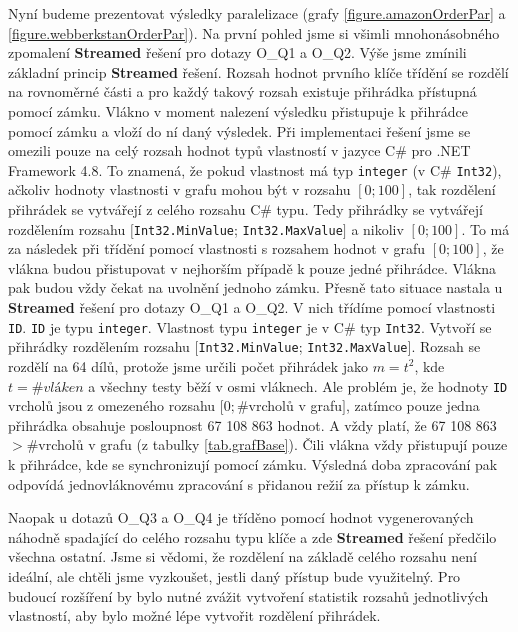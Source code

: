 Nyní budeme prezentovat výsledky paralelizace (grafy \ref{figure.amazonOrderPar} a \ref{figure.webberkstanOrderPar}).
Na první pohled jsme si všimli mnohonásobného zpomalení \textbf{Streamed} řešení pro dotazy O\_Q1 a O\_Q2.
Výše jsme zmínili základní princip \textbf{Streamed} řešení.
Rozsah hodnot prvního klíče třídění se rozdělí na rovnoměrné části a pro každý takový rozsah existuje přihrádka přístupná pomocí zámku.
Vlákno v moment nalezení výsledku přistupuje k přihrádce pomocí zámku a vloží do ní daný výsledek.
Při implementaci řešení jsme se omezili pouze na celý rozsah hodnot typů vlastností v jazyce C\# pro .NET Framework 4.8.
To znamená, že pokud vlastnost má typ \texttt{integer} (v C\# \texttt{Int32}), ačkoliv hodnoty vlastnosti v grafu mohou být v rozsahu $[0; 100]$, tak rozdělení přihrádek se vytvářejí z celého rozsahu C\# typu.
Tedy přihrádky se vytvářejí rozdělením rozsahu $[$\verb+Int32.MinValue+; \verb+Int32.MaxValue+$]$ a nikoliv $[0; 100]$.
To má za následek při třídění pomocí vlastnosti s rozsahem hodnot v grafu $[0; 100]$, že vlákna budou přistupovat v nejhorším případě k pouze jedné přihrádce.
Vlákna pak budou vždy čekat na uvolnění jednoho zámku.
Přesně tato situace nastala u \textbf{Streamed} řešení pro dotazy O\_Q1 a O\_Q2.
V nich třídíme pomocí vlastnosti \texttt{ID}. 
\texttt{ID} je typu \texttt{integer}.
Vlastnost typu \texttt{integer} je v C\# typ \texttt{Int32}.
Vytvoří se přihrádky rozdělením rozsahu $[$\verb+Int32.MinValue+; \verb+Int32.MaxValue+$]$.
Rozsah se rozdělí na 64 dílů, protože jsme určili počet přihrádek jako $m=t^2$, kde $t=\#vláken$ a všechny testy běží v osmi vláknech.
Ale problém je, že hodnoty \texttt{ID} vrcholů jsou z omezeného rozsahu $[0; \#$vrcholů v grafu$]$, zatímco pouze jedna přihrádka obsahuje posloupnost 67 108 863 hodnot.
A vždy platí, že 67 108 863 $> \# $vrcholů v grafu (z tabulky \ref{tab.grafBase}).
Čili vlákna vždy přistupují pouze k přihrádce, kde se synchronizují pomocí zámku. 
Výsledná doba zpracování pak odpovídá jednovláknovému zpracování s přidanou režií za přístup k zámku.

Naopak u dotazů O\_Q3 a O\_Q4 je tříděno pomocí hodnot vygenerovaných náhodně spadající do celého rozsahu typu klíče a zde \textbf{Streamed} řešení předčilo všechna ostatní. 
Jsme si vědomi, že rozdělení na základě celého rozsahu není ideální, ale chtěli jsme vyzkoušet, jestli daný přístup bude využitelný.
Pro budoucí rozšíření by bylo nutné zvážit vytvoření statistik rozsahů jednotlivých vlastností, aby bylo možné lépe vytvořit rozdělení přihrádek.

